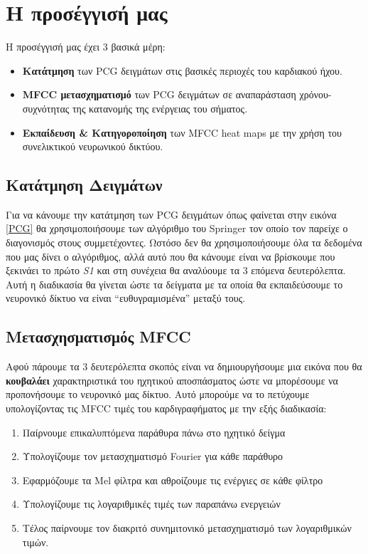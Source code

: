 \section{Η προσέγγισή μας}\label{our_approach}

Η προσέγγισή μας έχει 3 βασικά μέρη:
\begin{itemize}
	\item \textbf{Κατάτμηση} των PCG δειγμάτων στις βασικές περιοχές του καρδιακού
	      ήχου.
	\item \textbf{MFCC μετασχηματισμό} των PCG δειγμάτων σε αναπαράσταση
	      χρόνου-συχνότητας της κατανομής της ενέργειας του σήματος.
	\item \textbf{Εκπαίδευση \& Κατηγοροποίηση} των MFCC heat maps με την χρήση
	      του συνελικτικού νευρωνικού δικτύου.
\end{itemize}

\subsection{Κατάτμηση Δειγμάτων}

Για να κάνουμε την κατάτμηση των PCG δειγμάτων όπως φαίνεται στην εικόνα
\ref{PCG} θα χρησιμοποιήσουμε των αλγόριθμο του Springer
\cite{springer2015logistic} τον οποίο τον παρείχε ο διαγονισμός στους
συμμετέχοντες. Ωστόσο δεν θα χρησιμοποιήσουμε όλα τα δεδομένα που μας δίνει ο
αλγόριθμος, αλλά αυτό που θα κάνουμε είναι να βρίσκουμε που ξεκινάει το πρώτο
\emph{S1} και στη συνέχεια θα αναλύουμε τα 3 επόμενα δευτερόλεπτα. Αυτή η
διαδικασία θα γίνεται ώστε τα δείγματα με τα οποία θα εκπαιδεύσουμε το νευρονικό
δίκτυο να είναι ``ευθυγραμισμένα'' μεταξύ τους.


\subsection{Μετασχησματισμός MFCC}

Αφού πάρουμε τα 3 δευτερόλεπτα σκοπός είναι να δημιουργήσουμε μια εικόνα που θα
\textbf{κουβαλάει} χαρακτηριστικά του ηχητικού αποσπάσματος ώστε να μπορέσουμε 
να προπονήσουμε το νευρονικό μας δίκτυο. Αυτό μπορούμε να το πετύχουμε υπολογίζοντας
τις MFCC τιμές του καρδιγραφήματος με την εξής διαδικασία:
\begin{enumerate}
  \item Παίρνουμε επικαλυπτόμενα παράθυρα πάνω στο ηχητικό δείγμα
  \item Υπολογίζουμε τον μετασχηματισμό Fourier για κάθε παράθυρο
  \item Εφαρμόζουμε τα Mel φίλτρα και αθροίζουμε τις ενέργιες σε κάθε φίλτρο
  \item Υπολογίζουμε τις λογαριθμικές τιμές των παραπάνω ενεργειών
  \item Τέλος παίρνουμε τον διακριτό συνημιτονικό μετασχηματισμό των λογαριθμικών
    τιμών.
\end{enumerate}

